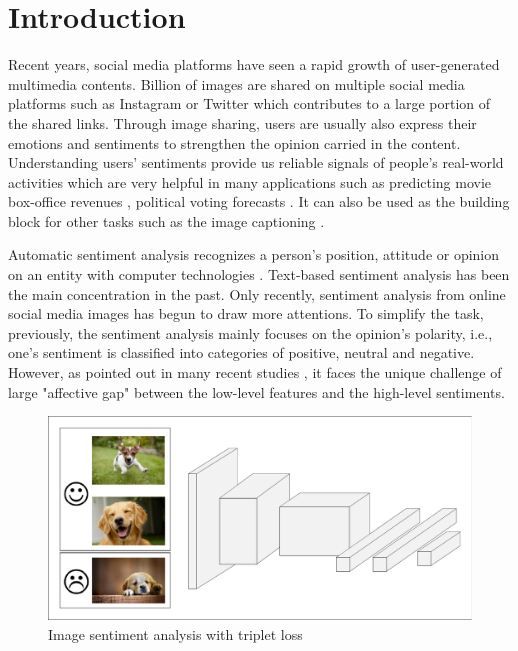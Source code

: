 \section{Introduction}
\label{introduction}

Recent years, social media platforms have seen a rapid growth of user-generated multimedia contents. Billion of images are shared on multiple social media platforms such as Instagram or Twitter which contributes to a large portion of the shared links. Through image sharing, users are usually also express their emotions and sentiments to strengthen the opinion carried in the content. Understanding users' sentiments provide us reliable signals of people's real-world activities which are very helpful in many applications such as predicting movie box-office revenues \cite{asur2010predicting}, political voting forecasts \cite{o2010tweets}. It can also be used as the building block for other tasks such as the image captioning \cite{vinyals2015show}.

Automatic sentiment analysis recognizes a person's position, attitude or opinion on an entity with computer technologies \cite{soleymani2017survey}. Text-based sentiment analysis has been the main concentration in the past. Only recently, sentiment analysis from online social media images has begun to draw more attentions. To simplify the task, previously, the sentiment analysis mainly focuses on the opinion's polarity, i.e., one's sentiment is classified into categories of positive, neutral and negative. 
However, as pointed out in many recent studies \cite{borth2013large, yuan2013sentribute, chen2014deepsentibank, ahsan2017towards}, it faces the unique challenge of large "affective gap" between the low-level features and the high-level sentiments. 

\begin{figure}[h]
    \centering
    \includegraphics[width=\linewidth]{./figures/intro.pdf}
    \caption{Image sentiment analysis with triplet loss}
    \label{fig:intro}
\end{figure}

